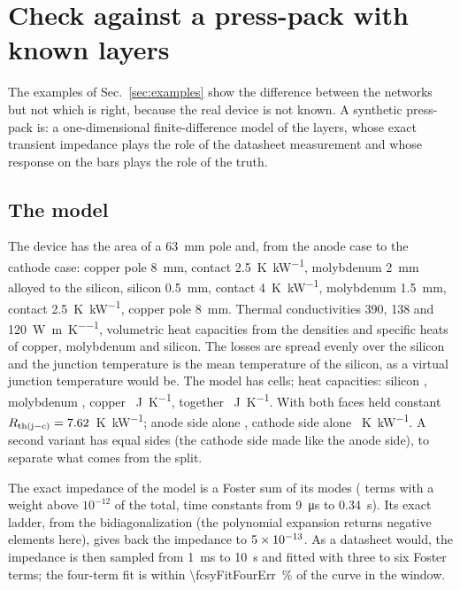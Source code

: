 \documentclass[10pt,a4paper]{scrartcl}
\newcommand{\Rjc}{R_\mathrm{th(j-c)}}
\newcommand{\KkW}{\si{\kelvin\per\kilo\watt}}
\newcommand{\JK}{\si{\joule\per\kelvin}}
\begin{document}
\section{Check against a press-pack with known layers}
\label{sec:synthetic}
The examples of Sec.~\ref{sec:examples} show the difference between the networks but not which is right, because the real device is not known. A synthetic press-pack is: a one-dimensional finite-difference model of the layers, whose exact transient impedance plays the role of the datasheet measurement and whose response on the bars plays the role of the truth.

\subsection{The model}
The device has the area of a \SI{63}{\milli\metre} pole and, from the anode case to the cathode case: copper pole \SI{8}{\milli\metre}, contact \SI{2.5}{\kelvin\per\kilo\watt}, molybdenum \SI{2}{\milli\metre} alloyed to the silicon, silicon \SI{0.5}{\milli\metre}, contact \SI{4}{\kelvin\per\kilo\watt}, molybdenum \SI{1.5}{\milli\metre}, contact \SI{2.5}{\kelvin\per\kilo\watt}, copper pole \SI{8}{\milli\metre}. Thermal conductivities \num{390}, \num{138} and \SI{120}{\watt\per\metre\per\kelvin}, volumetric heat capacities from the densities and specific heats of copper, molybdenum and silicon. The losses are spread evenly over the silicon and the junction temperature is the mean temperature of the silicon, as a virtual junction temperature would be. The model has \fcsyNodes{} cells; heat capacities: silicon \fcsyCsi, molybdenum \fcsyCmo, copper \fcsyCcu~\JK, together \fcsyCtot~\JK. With both faces held constant $\Rjc = \fcsyRth$~\KkW; anode side alone \fcsyRa, cathode side alone \fcsyRc~\KkW. A second variant has equal sides (the cathode side made like the anode side), to separate what comes from the split.

The exact impedance of the model is a Foster sum of its modes (\fcsyModes{} terms with a weight above $10^{-12}$ of the total, time constants from \SI{9}{\micro\second} to \SI{0.34}{\second}). Its exact ladder, from the bidiagonalization (the polynomial expansion returns negative elements here), gives back the impedance to $5\times 10^{-13}$. As a datasheet would, the impedance is then sampled from \SI{1}{\milli\second} to \SI{10}{\second} and fitted with three to six Foster terms; the four-term fit is within \SI{\fcsyFitFourErr}{\percent} of the curve in the window.
\end{document}
